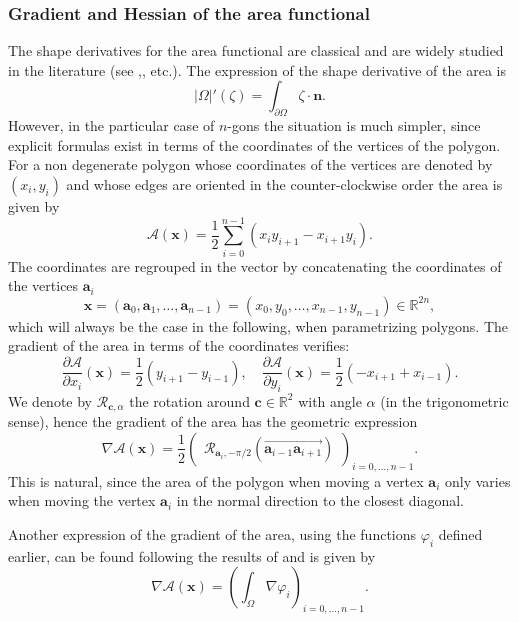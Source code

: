 \documentclass[11pt]{article}
\numberwithin{equation}{section}\newtheorem*{jepEnonce}{\jepEnonceTitle}\newenvironment{enonce*}[1]{\def\jepEnonceTitle{#1}\jepEnonce}{\endjepEnonce}\newtheorem*{conj*}{Conjecture}
\theoremstyle{plain}
\theoremstyle{definition}
\newcommand{\bo}[1]{{\boldsymbol#1}}
\let\Bbb\mathbb
\begin{document}
\subsubsection*{Gradient and Hessian of the area functional} The shape derivatives for the area functional are classical and are widely studied in the literature (see \cite{henrot-pierre-english},\cite{laurain2ndDeriv}, etc.). The expression of the shape derivative of the area is
\begin{equation}
|\Omega|'(\zeta) = \int_{\partial\Omega} \zeta \cdot \bo n.
\label{eq:sh-deriv-area}
\end{equation} However, in the particular case of $n$-gons the situation is much simpler, since explicit formulas exist in terms of the coordinates of the vertices of the polygon. For a non degenerate polygon whose coordinates of the vertices are denoted by $(x_i,y_i)$ and whose edges are oriented in the counter-clockwise order the area is given by
\[
\mathcal A(\bo x) = \frac{1}{2} \sum_{i=0}^{n-1} (x_iy_{i+1}-x_{i+1}y_i).
\]
The coordinates are regrouped in the vector by concatenating the coordinates of the vertices $\bo a_i$
\begin{equation}
\bo x = (\bo a_0,\bo a_1,\dots,\bo a_{n-1}) = (x_0,y_0,\dots,x_{n-1},y_{n-1})\in \Bbb{R}^{2n},
\label{eq:coordinates}
\end{equation}
which will always be the case in the following, when parametrizing polygons.
The gradient of the area in terms of the coordinates verifies:
\[
\frac{\partial \mathcal A}{\partial x_i}(\bo x) = \frac{1}{2}(y_{i+1}-y_{i-1}), \quad
\frac{\partial \mathcal A}{\partial y_i}(\bo x) = \frac{1}{2}(-x_{i+1}+x_{i-1}).
\]
We denote by $\mathcal R_{\bo c,\alpha}$ the rotation around $\bo c \in \Bbb{R}^2$ with angle $\alpha$ (in the trigonometric sense), hence the gradient of the area has the geometric expression
\begin{equation}
\nabla \mathcal A(\bo x) = \frac{1}{2}\begin{pmatrix}
\mathcal R_{\bo a_i,-\pi/2}(\overrightarrow{\bo a_{i-1}\bo a_{i+1}})
\end{pmatrix}_{i=0,\dots,n-1}.
\label{eq:grad-area}
\end{equation}
This is natural, since the area of the polygon when moving a vertex $\bo a_i$ only varies when moving the vertex $\bo a_i$ in the normal direction to the closest diagonal.

Another expression of the gradient of the area, using the functions $\varphi_i$ defined earlier, can be found following the results of \cite{laurain2ndDeriv} and is given by
\begin{equation}
\nabla \mathcal A(\bo x) = \left(\int_\Omega \nabla \varphi_i\right)_{i=0,\dots,n-1}.
\label{eq:grad-area-phi}
\end{equation}
\end{document}
